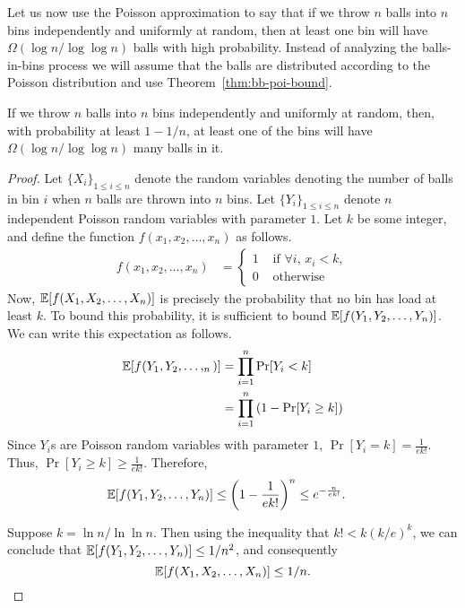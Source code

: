 Let us now use the Poisson approximation to say that if we throw $n$ balls into
$n$ bins independently and uniformly at random, then at least one bin will have
$\Omega(\log n/\log \log n)$ balls with high probability. Instead of analyzing
the balls-in-bins process we will assume that the balls are distributed
according to the Poisson distribution and use Theorem~\ref{thm:bb-poi-bound}.

\begin{theorem}
  If we throw $n$ balls into $n$ bins independently and uniformly at random,
  then, with probability at least $1 - 1/n$, at least one of the bins will have
  $\Omega(\log n/\log \log n)$ many balls in it.
  \label{thm:load-lb}
\end{theorem}
\begin{proof}
  Let $\{X_i\}_{1\leq i\leq n}$ denote the random variables denoting the number
  of balls in bin $i$ when $n$ balls are thrown into $n$ bins. Let
  $\{Y_i\}_{1 \leq i\leq n}$ denote $n$ independent Poisson random variables
  with parameter $1$. Let $k$ be some integer, and define the function
  $f(x_1, x_2, \ldots, x_n)$ as follows.
  \begin{align*}
    f(x_1, x_2, \ldots, x_n) &=
                               \begin{cases}
                                 1 & \text{ if $\forall i$, $x_i < k$},\\
                                 0 & \text{ otherwise}
                               \end{cases}
  \end{align*}
  Now, $\mathbb{E}[f(X_1, X_2, \ldots, X_n)]$ is precisely the probability that no bin
  has load at least $k$. To bound this probability, it is sufficient to bound
  $\mathbb{E}[f(Y_1, Y_2, \ldots, Y_n)]$. We can write this expectation as follows.
  \begin{align*}
    \mathbb{E}[f(Y_1, Y_2, \ldots, _n)] &= \prod_{i=1}^n \Pr[Y_i < k] \\
    &= \prod_{i=1}^n \left(1 - \Pr[Y_i \geq k] \right)
  \end{align*}
  Since $Y_i$s are Poisson random variables with parameter $1$,
  $\Pr[Y_i = k] = \frac{1}{ek!}$. Thus, $\Pr[Y_i \geq k] \geq \frac{1}{ek!}$.
  Therefore,
  \begin{align*}
    \mathbb{E}[f(Y_1, Y_2, \ldots, Y_n)] &\leq \left(1 - \frac{1}{ek!} \right)^n \leq e^{-\frac{n}{ek!}}.
  \end{align*}

  Suppose $k = \ln n/\ln\ln n$. Then using the inequality that $k! < k (k/e)^k$,
  we can conclude that $\mathbb{E}[f(Y_1, Y_2, \ldots, Y_n)] \leq 1/n^2$, and
  consequently $$\mathbb{E}[f(X_1, X_2, \ldots, X_n)] \leq 1/n.$$
\end{proof}


